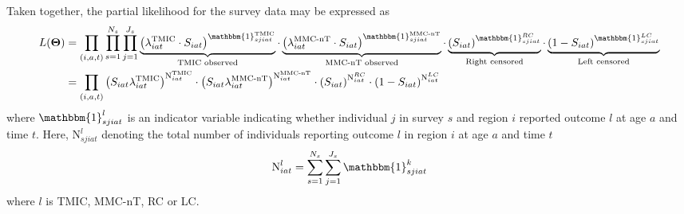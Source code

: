 \documentclass{article}
\begin{document}
\begin{appendix}
\noindent Taken together, the partial likelihood for the survey data may be expressed as 
\begin{eqnarray*}
	L(\boldsymbol{\Theta}) &= \displaystyle\prod_{(i,a,t)} \prod_{s=1}^{N_s} \prod_{j=1}^{J_s}  \underbrace{\left(\lambda^{\text{TMIC}}_{iat}\cdot S_{iat}\right)^{\mathbbm{1}^{\text{TMIC}}_{sjiat}}}_{\text{TMIC observed}} \cdot  \underbrace{ \left(\lambda^{\text{MMC-nT}}_{iat} \cdot S_{iat}\right)^{\mathbbm{1}^\text{MMC-nT}_{sjiat}}}_{\text{MMC-nT observed}} \cdot
	  \underbrace{\left(S_{iat}\right)^{\mathbbm{1}^{RC}_{sjiat}}}_{\text{Right censored}} \cdot \underbrace{\left(1-S_{iat}\right)^{\mathbbm{1}^{LC}_{sjiat}}}_{\text{Left censored}} \\
	   &= \displaystyle\prod_{(i,a,t)} \left(S_{iat}\lambda^{\text{TMIC}}_{iat}\right)^{\text{N}^{\text{TMIC}}_{iat}} \cdot \left(S_{iat}\lambda^{\text{MMC-nT}}_{iat}\right)^{\text{N}^\text{MMC-nT}_{iat}} \cdot
       \left(S_{iat}\right)^{\text{N}^{RC}_{iat}} \cdot \left(1-S_{iat}\right)^{\text{N}^{LC}_{iat}}
\end{eqnarray*}
where $\mathbbm{1}^{l}_{sjiat}$ is an indicator variable indicating whether individual $j$ in survey $s$ and region $i$ reported outcome $l$ at age $a$ and time $t$. Here, $\text{N}^{l}_{sjiat}$ denoting the total number of individuals reporting outcome $l$ in region $i$ at age $a$ and time $t$
\begin{equation*}
	\text{N}^{l}_{iat} = \sum_{s=1}^{N_s}\sum_{j=1}^{J_s} \mathbbm{1}^k_{sjiat}
\end{equation*}
where $l$ is TMIC, MMC-nT, RC or LC.\\


\end{appendix}
\end{document}
